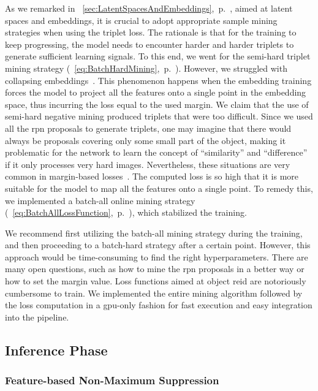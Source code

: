 As we remarked in \sectiontext{}~\ref{sec:LatentSpacesAndEmbeddings},~p.~\pageref{sec:LatentSpacesAndEmbeddings}, aimed at latent spaces and embeddings, it is crucial to adopt appropriate sample mining strategies when using the triplet loss. The rationale is that for the training to keep progressing, the model needs to encounter harder and harder triplets to generate sufficient learning signals. To this end, we went for the semi-hard triplet mining strategy (\eqtext{}~\ref{eq:BatchHardMining},~p.~\pageref{eq:BatchHardMining}). However, we struggled with collapsing embeddings~\cite{levi2021rethinking}. This phenomenon happens when the embedding training forces the model to project all the features onto a single point in the embedding space, thus incurring the loss equal to the used margin. We claim that the use of semi-hard negative mining produced triplets that were too difficult. Since we used all the \gls{rpn} proposals to generate triplets, one may imagine that there would always be proposals covering only some small part of the object, making it problematic for the network to learn the concept of ``similarity'' and ``difference'' if it only processes very hard images. Nevertheless, these situations are very common in margin-based losses~\cite{levi2021rethinking}. The computed loss is so high that it is more suitable for the model to map all the features onto a single point. To remedy this, we implemented a batch-all online mining strategy (\eqtext{}~\ref{eq:BatchAllLossFunction},~p.~\pageref{eq:BatchAllLossFunction}), which stabilized the training.

We recommend first utilizing the batch-all mining strategy during the training, and then proceeding to a batch-hard strategy after a certain point. However, this approach would be time-consuming to find the right hyperparameters. There are many open questions, such as how to mine the \gls{rpn} proposals in a better way or how to set the margin value. Loss functions aimed at object \gls{reid} are notoriously cumbersome to train. We implemented the entire mining algorithm followed by the loss computation in a \gls{gpu}-only fashion for fast execution and easy integration into the pipeline.

\subsection{Inference Phase}

\subsubsection{Feature-based Non-Maximum Suppression}
\label{sssec:FeatureNonMaximumSuppression}

